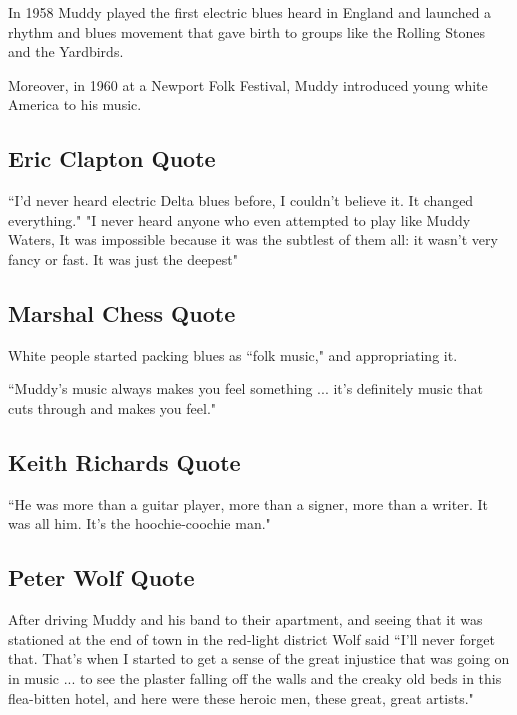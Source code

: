 \documentclass[12pt, a4paper, twoside, openright, titlepage]{book}
\begin{document}
\begin{rmk}{}{}
    In 1958 Muddy played the first electric blues heard in England and launched a rhythm and blues movement that gave birth to groups like the Rolling Stones and the Yardbirds.

    Moreover, in 1960 at a Newport Folk Festival, Muddy introduced young white America to his music.
\end{rmk}

\subsection{Eric Clapton Quote}

``I'd never heard electric Delta blues before, I couldn't believe it. It changed everything." "I never heard anyone who even attempted to play like Muddy Waters, It was impossible because it was the subtlest of them all: it wasn't very fancy or fast. It was just the deepest"

\subsection{Marshal Chess Quote}

White people started packing blues as ``folk music," and appropriating it.


``Muddy's music always makes you feel something ... it's definitely music that cuts through and makes you feel."

\subsection{Keith Richards Quote}

``He was more than a guitar player, more than a signer, more than a writer. It was all him. It's the hoochie-coochie man."

\subsection{Peter Wolf Quote}

After driving Muddy and his band to their apartment, and seeing that it was stationed at the end of town in the red-light district Wolf said ``I'll never forget that. That's when I started to get a sense of the great injustice that was going on in music ... to see the plaster falling off the walls and the creaky old beds in this flea-bitten hotel, and here were these heroic men, these great, great artists."
\end{document}
